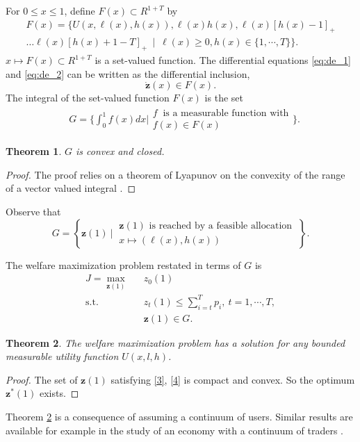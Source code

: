 \documentclass[10pt,draftcls,onecolumn]{IEEEtran}
\newtheorem{theorem}{Theorem}
\let \VEC \mathbf
\newcounter{l1}
\newcounter{l2}
\newcounter{l3}
\begin{document}
For $0 \le x \le 1$, define $F(x) \subset R^{1+T}$ by
\begin{equation}
\begin{aligned}
F(x) = \Big\{U(x,\ell(x),h(x)), \ell(x)h(x),  \ell(x) [h(x)-1]_+ \\
\ldots \ell(x) [h(x)+1 -T]_+  ~\mid~ \ell(x) \ge 0, h(x) \in \{1, \cdots, T\}\Big\} .\nonumber
\end{aligned}
\end{equation}
$x \mapsto F(x) \subset R^{1+T}$ is a set-valued function. 
The differential equations \eqref{eq:de_1} and \eqref{eq:de_2} can be
written as the differential inclusion,
\[\dot{\VEC z}(x) \in F(x).\]
 The integral of the set-valued function $F(x)$ is  the set
 \begin{align} 
 &G = \Big\{ \int_0^1 f(x)dx \Big| \begin{array}{l}f~\mbox{ is a measurable function with}\\
 f(x) \in F(x) \end{array} \Big\}.
 \end{align}
\begin{theorem}
$G $ is convex and closed.  
\end{theorem}
\begin{proof}
The proof relies on a theorem of Lyapunov on the convexity of the range of a vector
 valued integral \cite{aumann65}.
\end{proof}
Observe that
\begin{equation*}
G = \left\{\VEC z(1) ~\Big|~ \begin{array}{l}\VEC z(1) \mbox{ is reached by a feasible allocation}~\\  x \mapsto (\ell(x), h(x)) \end{array}\right\}.
\end{equation*}  


The welfare maximization problem restated in terms of $G$ is
\begin{eqnarray}
J = \max_{\VEC z(1)} && z_0(1) \label{j1} \\
\mbox{s.t.} && z_t (1) \le \sum_{i=t}^T p_i, \ t=1, \cdots, T,\label{3}\\
&& \VEC z(1) \in G .\label{4}
\end{eqnarray}

\begin{theorem} \label{theorem5}
The welfare maximization problem has a solution for any bounded measurable utility function $U(x,l,h)$.
\end{theorem}
\begin{proof}
The set of $\VEC z(1)$ satisfying \eqref{3}, \eqref{4} is compact and convex.  So the optimum $\VEC z^*(1)$ exists.  
\end{proof}
Theorem \ref{theorem5}  is a  consequence of assuming a continuum of users. Similar results are available for example in the study of an economy with a continuum of traders \cite{aumann2}.
\end{document}
